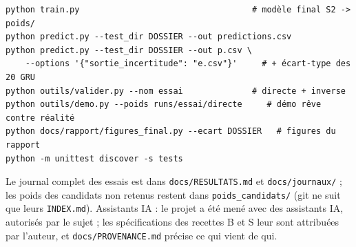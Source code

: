 \documentclass[11pt,a4paper]{article}
\newcommand{\code}[1]{\texttt{#1}}
\begin{document}
\begin{small}
\begin{verbatim}
python train.py                                   # modèle final S2 -> poids/
python predict.py --test_dir DOSSIER --out predictions.csv
python predict.py --test_dir DOSSIER --out p.csv \
    --options '{"sortie_incertitude": "e.csv"}'     # + écart-type des 20 GRU
python outils/valider.py --nom essai              # directe + inverse
python outils/demo.py --poids runs/essai/directe     # démo rêve contre réalité
python docs/rapport/figures_final.py --ecart DOSSIER   # figures du rapport
python -m unittest discover -s tests
\end{verbatim}
\end{small}

Le journal complet des essais est dans \code{docs/RESULTATS.md} et \code{docs/journaux/} ; les poids des candidats non retenus restent dans \code{poids\_candidats/} (git ne suit que leurs \code{INDEX.md}). Assistants IA : le projet a été mené avec des assistants IA, autorisés par le sujet ; les spécifications des recettes B et S leur sont attribuées par l'auteur, et \code{docs/PROVENANCE.md} précise ce qui vient de qui.
\end{document}

